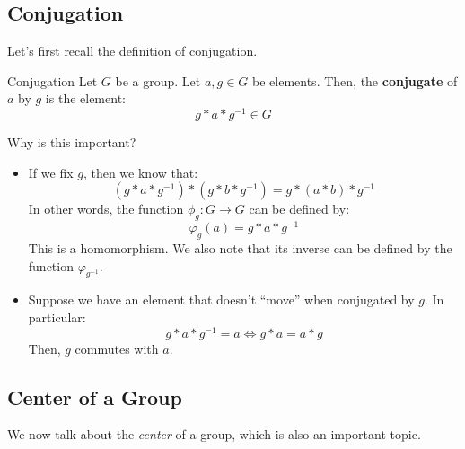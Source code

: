 \documentclass[letterpaper]{article}
\begin{document}
\subsection{Conjugation}
Let's first recall the definition of conjugation.
\begin{definition}{Conjugation}{}
    Let $G$ be a group. Let $a, g \in G$ be elements. Then, the \textbf{conjugate} of $a$ by $g$ is the element: 
    \[g * a * g^{-1} \in G\]
\end{definition}
Why is this important? 
\begin{itemize}
    \item If we fix $g$, then we know that: 
    \[(g * a * g^{-1}) * (g * b * g^{-1}) = g * (a * b) * g^{-1}\]
    In other words, the function $\phi_g: G \to G$ can be defined by: 
    \[\varphi_{g}(a) = g * a * g^{-1}\]
    This is a homomorphism. We also note that its inverse can be defined by the function $\varphi_{g^{-1}}$.
    
    \item Suppose we have an element that doesn't ``move'' when conjugated by $g$. In particular: 
    \[g * a * g^{-1} = a \iff g * a = a * g\]
    Then, $g$ commutes with $a$. 
\end{itemize}

\subsection{Center of a Group}
We now talk about the \emph{center} of a group, which is also an important topic. 
\end{document}
